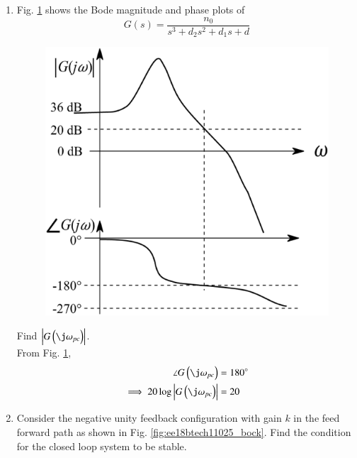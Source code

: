 \begin{enumerate}[label=\thesubsection.\arabic*.,ref=\thesubsection.\theenumi]


\item   Fig. \ref{fig:ee18btech11025} shows  the Bode magnitude and phase plots of 
    \begin{equation}  
            G(s) = \frac{n_0}{s^3 + d_2 s^2 + d_1 s + d}
    \end{equation}
\begin{figure}[ht!]
        \includegraphics[width=\columnwidth]{./figs/ee18btech11025/q42_1.eps}
        \caption{}
        \label{fig:ee18btech11025}
\end{figure}
Find  $\abs{G\brak{\j\omega_{pc}}}$.
\\
\solution From Fig. \ref{fig:ee18btech11025}, 
%
\begin{align}
\angle G\brak{\j\omega_{pc}}  &= 180 \degree
\\
\implies 20\log\abs{ G\brak{\j\omega_{pc}}}  &= 20
\label{ee18btech11025_g_gain}
%
\end{align}
%


\item  Consider the negative unity feedback configuration with gain $k$ in the feed forward path as shown in Fig.     \ref{fig:ee18btech11025_bock}.  Find the condition for the closed loop system to be stable.
%
\begin{figure}[h]
    

\end{figure}
\end{enumerate}
